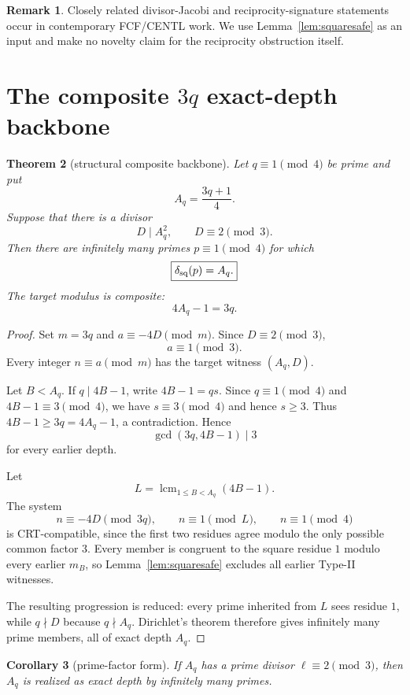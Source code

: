 \documentclass[11pt]{article}
\newtheorem{theorem}{Theorem}
\newtheorem{corollary}[theorem]{Corollary}
\theoremstyle{definition}
\newtheorem{remark}[theorem]{Remark}
\newcommand{\sqdepth}{\delta_{\rm sq}}
\begin{document}
\begin{remark}
Closely related divisor-Jacobi and reciprocity-signature statements occur in contemporary FCF/CENTL work. We use Lemma~\ref{lem:squaresafe} as an input and make no novelty claim for the reciprocity obstruction itself.
\end{remark}

\section{The composite $3q$ exact-depth backbone}

\begin{theorem}[structural composite backbone]\label{thm:backbone}
Let $q\equiv1\pmod4$ be prime and put
\[
A_q=\frac{3q+1}{4}.
\]
Suppose that there is a divisor
\[
D\mid A_q^2,\qquad D\equiv2\pmod3.
\]
Then there are infinitely many primes $p\equiv1\pmod4$ for which
\[
\boxed{\sqdepth(p)=A_q.}
\]
The target modulus is composite:
\[
4A_q-1=3q.
\]
\end{theorem}

\begin{proof}
Set $m=3q$ and $a\equiv-4D\pmod m$. Since $D\equiv2\pmod3$,
\[
a\equiv1\pmod3.
\]
Every integer $n\equiv a\pmod m$ has the target witness $(A_q,D)$.

Let $B<A_q$. If $q\mid 4B-1$, write $4B-1=qs$. Since $q\equiv1\pmod4$ and $4B-1\equiv3\pmod4$, we have $s\equiv3\pmod4$ and hence $s\ge3$. Thus $4B-1\ge3q=4A_q-1$, a contradiction. Hence
\[
\gcd(3q,4B-1)\mid3
\]
for every earlier depth.

Let
\[
L=\operatorname{lcm}_{1\le B<A_q}(4B-1).
\]
The system
\[
n\equiv-4D\pmod{3q},\qquad
n\equiv1\pmod L,\qquad
n\equiv1\pmod4
\]
is CRT-compatible, since the first two residues agree modulo the only possible common factor $3$. Every member is congruent to the square residue $1$ modulo every earlier $m_B$, so Lemma~\ref{lem:squaresafe} excludes all earlier Type-II witnesses.

The resulting progression is reduced: every prime inherited from $L$ sees residue $1$, while $q\nmid D$ because $q\nmid A_q$. Dirichlet's theorem therefore gives infinitely many prime members, all of exact depth $A_q$.
\end{proof}

\begin{corollary}[prime-factor form]\label{cor:pf}
If $A_q$ has a prime divisor $\ell\equiv2\pmod3$, then $A_q$ is realized as exact depth by infinitely many primes.
\end{corollary}
\end{document}
